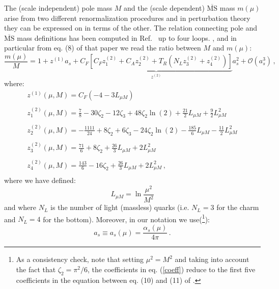 \documentclass[10pt,a4paper]{article}
\begin{document}
The (scale independent) pole mass $M$ and the (scale dependent)
$\overline{\mbox{MS}}$ mass $m(\mu)$ arise from two different
renormalization procedures and in perturbation theory they can be
expressed on in terms of the other. The relation connecting pole and
$\overline{\mbox{MS}}$ mass definitions has been computed in
Ref.~\cite{Chetyrkin:1999qi} up to four loops.
, and in particular from eq. (8) of that paper
we read the ratio between $M$ and $m(\mu)$:
\begin{equation}
\frac{m(\mu)}{M} = 1 +
z^{(1)}a_s+\underbrace{C_F\left[C_Fz_1^{(2)}+C_Az_2^{(2)}+T_R\left(N_Lz_3^{(2)}+z_4^{(2)}\right)\right]}_{z^{(2)}}a_s^2+\mathcal{O}(a_s^3)\,,
\label{straight}
\end{equation}
where:
\begin{equation}
\begin{array}{l}
\displaystyle z^{(1)}(\mu,M) = C_F\left(- 4 - 3L_{\mu M}\right)\\
\\
\displaystyle z_{1}^{(2)}(\mu,M) = \frac{7}{8} - 30\zeta_2 - 12\zeta_3 + 48\zeta_2\ln(2) + \frac{21}2L_{\mu M} + \frac92 L_{\mu M}^2\\
\\
\displaystyle z_{2}^{(2)}(\mu,M) = -\frac{1111}{24} + 8\zeta_2 +6\zeta_3 - 24\zeta_2\ln(2) - \frac{185}6L_{\mu M} - \frac{11}2 L_{\mu M}^2\\
\\
\displaystyle z_{3}^{(2)}(\mu,M) = \frac{71}{6} + 8\zeta_2 + \frac{26}3L_{\mu M} + 2 L_{\mu M}^2\\
\\
\displaystyle z_{4}^{(2)}(\mu,M) = \frac{143}{6} -16\zeta_2 + \frac{26}3L_{\mu M} + 2 L_{\mu M}^2\,,\\
\end{array}
\label{coeff}
\end{equation}
where we have defined:
\begin{equation}
L_{\mu M} = \ln\frac{\mu^2}{M^2}
\end{equation}
and where $N_L$ is the number of light (massless) quarks (i.e. $N_L=3$ for the charm and $N_L=4$ for the bottom). Moreover, in our notation we use(\footnote{As a consistency check, note that setting $\mu^2=M^2$ and taking into account the fact that $\zeta_2 = \pi^2/6$, the coefficients in eq. (\ref{coeff}) reduce to the first five coefficients in the equation between eq. (10) and (11) of \cite{Melnikov:2000qh}.}):
\begin{equation}
a_s\equiv a_s(\mu) = \frac{\alpha_s(\mu)}{4\pi}\,.
\end{equation}
\end{document}
